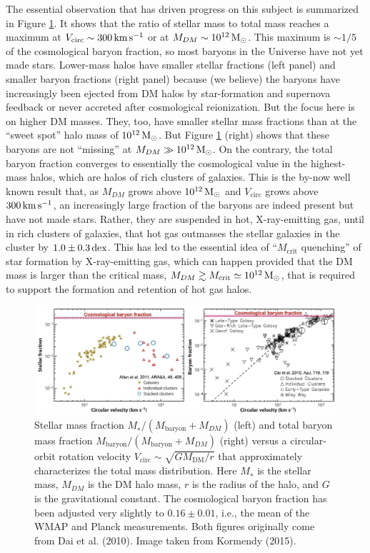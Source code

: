 \documentclass[a4paper,11pt]{article}
\begin{document}
{\noindent}The essential observation that has driven progress on this subject is summarized in Figure \ref{fig:sfquenching}. It shows that the ratio of stellar mass to total mass reaches a maximum at $V_\mathrm{circ}\sim300\,{\rm km\,s^{-1}}$ or at $M_{DM}\sim10^{12}\,{\rm M_\odot}$. This maximum is $\sim1/5$ of the cosmological baryon fraction, so most baryons in the Universe have not yet made stars. Lower-mass halos have smaller stellar fractions (left panel) and smaller baryon fractions (right panel) because (we believe) the baryons have increasingly been ejected from DM halos by star-formation and supernova feedback or never accreted after cosmological reionization. But the focus here is on higher DM masses. They, too, have smaller stellar mass fractions than at the ``sweet spot'' halo mass of $10^{12}\,{\rm M_\odot}$. But Figure \ref{fig:sfquenching} (right) shows that these baryons are not ``missing'' at $M_{DM}\gg10^{12}\,{\rm M_\odot}$. On the contrary, the total baryon fraction converges to essentially the cosmological value in the highest-mass halos, which are halos of rich clusters of galaxies. This is the by-now well known result that, as $M_{DM}$ grows above $10^{12}\,{\rm M_\odot}$ and $V_\mathrm{circ}$ grows above $300\,{\rm km\,s^{-1}}$, an increasingly large fraction of the baryons are indeed present but have not made stars. Rather, they are suspended in hot, X-ray-emitting gas, until in rich clusters of galaxies, that hot gas outmasses the stellar galaxies in the cluster by $1.0\pm0.3\,{\rm dex}$. This has led to the essential idea of ``$M_\mathrm{crit}$ quenching'' of star formation by X-ray-emitting gas, which can happen provided that the DM mass is larger than the critical mass, $M_{DM}\gtrsim M_\mathrm{crit}\simeq10^{12}\,{\rm M_\odot}$, that is required to support the formation and retention of hot gas halos.

\begin{figure}[h]
    \centering
    \includegraphics[width=16cm]{figures/SFquenching.png}
    \caption{\footnotesize{Stellar mass fraction $M_∗/(M_\mathrm{baryon}+M_{DM})$ (left) and total baryon mass fraction $M_\mathrm{baryon}/(M_\mathrm{baryon}+M_{DM})$ (right) versus a circular-orbit rotation velocity $V_\mathrm{circ}\sim \sqrt{GM_\mathrm{DM}/r}$ that approximately characterizes the total mass distribution. Here $M_∗$ is the stellar mass, $M_{DM}$ is the DM halo mass, $r$ is the radius of the halo, and $G$ is the gravitational constant. The cosmological baryon fraction has been adjusted very slightly to $0.16\pm0.01$, i.e., the mean of the WMAP and Planck measurements. Both figures originally come from Dai et al. (2010). Image taken from Kormendy (2015).}}
    \label{fig:sfquenching}
\end{figure}
\end{document}
